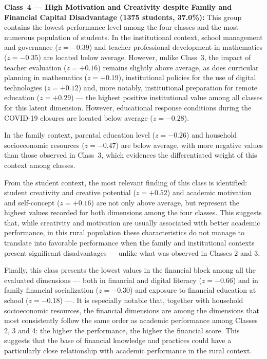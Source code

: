 \documentclass[runningheads]{llncs}
\begin{document}
\textbf{Class~4 --- High Motivation and Creativity despite Family
and Financial Capital Disadvantage (1375 students, 37.0\%):} This
group contains the lowest performance level among the four
classes and the most numerous population of students. In the
institutional context, school management and governance
(\(z = -0.39\)) and teacher professional development in
mathematics (\(z = -0.35\)) are located below average. However,
unlike Class~3, the impact of teacher evaluation (\(z = +0.16\))
remains slightly above average, as does curricular planning in
mathematics (\(z = +0.19\)), institutional policies for the use
of digital technologies (\(z = +0.12\)) and, more notably,
institutional preparation for remote education (\(z = +0.29\))
--- the highest positive institutional value among all classes
for this latent dimension. However, educational response
conditions during the COVID-19 closures are located below
average (\(z = -0.28\)).

In the family context, parental education level (\(z = -0.26\))
and household socioeconomic resources (\(z = -0.47\)) are below
average, with more negative values than those observed in
Class~3, which evidences the differentiated weight of this
context among classes.

From the student context, the most relevant finding of this
class is identified: student creativity and creative potential
(\(z = +0.52\)) and academic motivation and self-concept
(\(z = +0.16\)) are not only above average, but represent the
highest values recorded for both dimensions among the four
classes. This suggests that, while creativity and motivation are
usually associated with better academic performance, in this
rural population these characteristics do not manage to
translate into favorable performance when the family and
institutional contexts present significant disadvantages ---
unlike what was observed in Classes 2 and 3.

Finally, this class presents the lowest values in the financial
block among all the evaluated dimensions --- both in financial
and digital literacy (\(z = -0.66\)) and in family financial
socialization (\(z = -0.30\)) and exposure to financial
education at school (\(z = -0.18\)) ---. It is especially
notable that, together with household socioeconomic resources,
the financial dimensions are among the dimensions that most
consistently follow the same order as academic performance among
Classes 2, 3 and 4: the higher the performance, the higher the
financial score. This suggests that the base of financial
knowledge and practices could have a particularly close
relationship with academic performance in the rural context.
\end{document}
